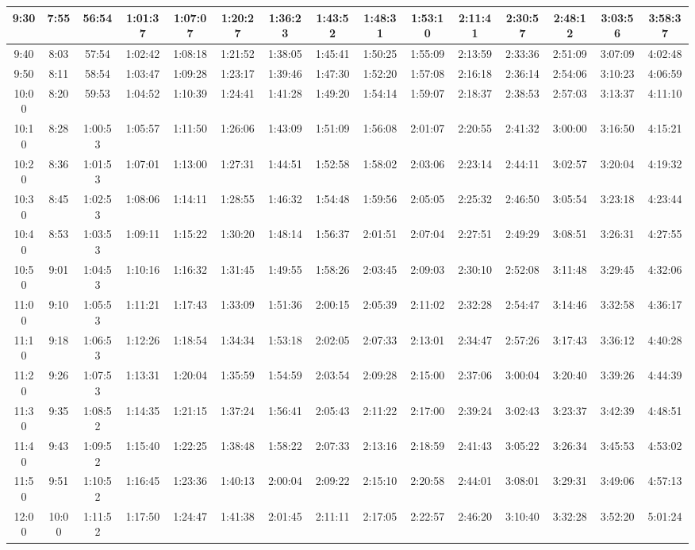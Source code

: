 \begin{scriptsize}
\begin{tabular}{c | c | c | c | c | c | c | c | c | c | c | c | c | c | c}
		9:30&7:55&56:54&1:01:37&1:07:07&1:20:27&1:36:23&1:43:52&1:48:31&1:53:10&2:11:41&2:30:57&2:48:12&3:03:56&3:58:37\\\hline
		9:40&8:03&57:54&1:02:42&1:08:18&1:21:52&1:38:05&1:45:41&1:50:25&1:55:09&2:13:59&2:33:36&2:51:09&3:07:09&4:02:48\\\hline
		9:50&8:11&58:54&1:03:47&1:09:28&1:23:17&1:39:46&1:47:30&1:52:20&1:57:08&2:16:18&2:36:14&2:54:06&3:10:23&4:06:59\\\hline
		10:00&8:20&59:53&1:04:52&1:10:39&1:24:41&1:41:28&1:49:20&1:54:14&1:59:07&2:18:37&2:38:53&2:57:03&3:13:37&4:11:10\\\hline
		10:10&8:28&1:00:53&1:05:57&1:11:50&1:26:06&1:43:09&1:51:09&1:56:08&2:01:07&2:20:55&2:41:32&3:00:00&3:16:50&4:15:21\\\hline
		10:20&8:36&1:01:53&1:07:01&1:13:00&1:27:31&1:44:51&1:52:58&1:58:02&2:03:06&2:23:14&2:44:11&3:02:57&3:20:04&4:19:32\\\hline
		10:30&8:45&1:02:53&1:08:06&1:14:11&1:28:55&1:46:32&1:54:48&1:59:56&2:05:05&2:25:32&2:46:50&3:05:54&3:23:18&4:23:44\\\hline
		10:40&8:53&1:03:53&1:09:11&1:15:22&1:30:20&1:48:14&1:56:37&2:01:51&2:07:04&2:27:51&2:49:29&3:08:51&3:26:31&4:27:55\\\hline
		10:50&9:01&1:04:53&1:10:16&1:16:32&1:31:45&1:49:55&1:58:26&2:03:45&2:09:03&2:30:10&2:52:08&3:11:48&3:29:45&4:32:06\\\hline
		11:00&9:10&1:05:53&1:11:21&1:17:43&1:33:09&1:51:36&2:00:15&2:05:39&2:11:02&2:32:28&2:54:47&3:14:46&3:32:58&4:36:17\\\hline
		11:10&9:18&1:06:53&1:12:26&1:18:54&1:34:34&1:53:18&2:02:05&2:07:33&2:13:01&2:34:47&2:57:26&3:17:43&3:36:12&4:40:28\\\hline
		11:20&9:26&1:07:53&1:13:31&1:20:04&1:35:59&1:54:59&2:03:54&2:09:28&2:15:00&2:37:06&3:00:04&3:20:40&3:39:26&4:44:39\\\hline
		11:30&9:35&1:08:52&1:14:35&1:21:15&1:37:24&1:56:41&2:05:43&2:11:22&2:17:00&2:39:24&3:02:43&3:23:37&3:42:39&4:48:51\\\hline
		11:40&9:43&1:09:52&1:15:40&1:22:25&1:38:48&1:58:22&2:07:33&2:13:16&2:18:59&2:41:43&3:05:22&3:26:34&3:45:53&4:53:02\\\hline
		11:50&9:51&1:10:52&1:16:45&1:23:36&1:40:13&2:00:04&2:09:22&2:15:10&2:20:58&2:44:01&3:08:01&3:29:31&3:49:06&4:57:13\\\hline
		12:00&10:00&1:11:52&1:17:50&1:24:47&1:41:38&2:01:45&2:11:11&2:17:05&2:22:57&2:46:20&3:10:40&3:32:28&3:52:20&5:01:24\\\hline
\end{tabular}\end{scriptsize}

